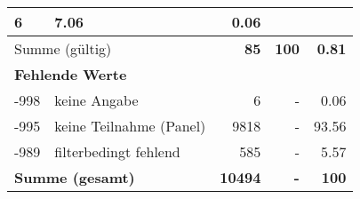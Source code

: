 \begin{longtable}{lXrrr}
       \num{6} &
       \num[round-mode=places,round-precision=2]{7,06} &
         \num[round-mode=places,round-precision=2]{0,06} \\
     \midrule
     \multicolumn{2}{l}{Summe (gültig)} &
       \textbf{\num{85}} &
     \textbf{100} &
       \textbf{\num[round-mode=places,round-precision=2]{0,81}} \\
     \multicolumn{5}{l}{\textbf{Fehlende Werte}}\\
       -998 &
       keine Angabe &
         \num{6} &
        - &
         \num[round-mode=places,round-precision=2]{0,06} \\
       -995 &
       keine Teilnahme (Panel) &
         \num{9818} &
        - &
         \num[round-mode=places,round-precision=2]{93,56} \\
       -989 &
       filterbedingt fehlend &
         \num{585} &
        - &
         \num[round-mode=places,round-precision=2]{5,57} \\
     \midrule
     \multicolumn{2}{l}{\textbf{Summe (gesamt)}} &
          \textbf{\num{10494}} &
        \textbf{-} &
        \textbf{100} \\
     \bottomrule
     \end{longtable}
     
